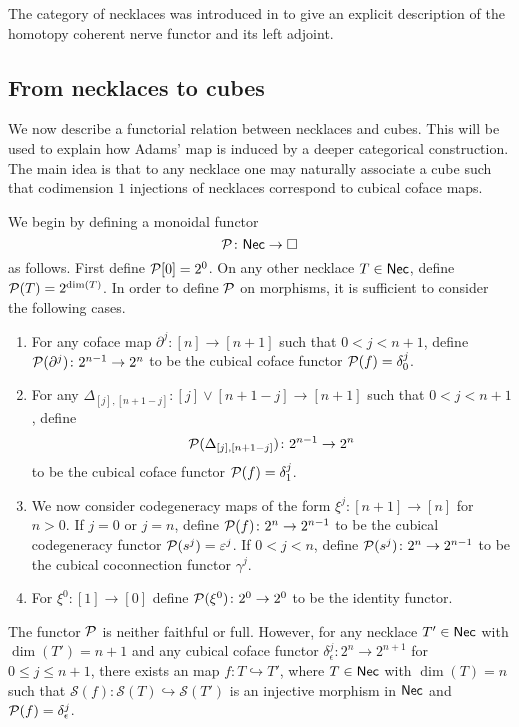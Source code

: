 \begin{remark*}
	The category of necklaces was introduced in \cite{dugger2011rigidification} to give an explicit description of the homotopy coherent nerve functor and its left adjoint.
\end{remark*}



\subsection{From necklaces to cubes}

We now describe a functorial relation between necklaces and cubes.
This will be used to explain how Adams' map is induced by a deeper categorical construction.
The main idea is that to any necklace one may naturally associate a cube such that codimension $1$ injections of necklaces correspond to cubical coface maps.

We begin by defining a monoidal functor
\[
\mathcal{P} \colon \mathsf{Nec} \to \square
\]
as follows.
First define $\mathcal{P}[0] = 2^0$.
On any other necklace $T \in \mathsf{Nec}$, define $\mathcal{P}(T) = 2^{\dim(T)}$.
In order to define $\mathcal{P}$ on morphisms, it is sufficient to consider the following cases.
\begin{enumerate}
	\item For any coface map $\partial^j \colon [n] \to [n+1]$ such that $0< j<{n+1}$, define $\mathcal{P}(\partial^j) \colon 2^{n-1}\to 2^{n}$ to be the cubical coface functor $\mathcal{P}(f)= \delta_0^{j}$.

	\item For any $\Delta_{[j], [n+1-j]} \colon [j] \vee [n+1-j] \to [n+1]$ such that $0<j<n+1$, define
	\[
	\mathcal{P}(\Delta_{[j], [n+1-j]}) \colon 2^{n-1}\to 2^{n}
	\]
	to be the cubical coface functor $\mathcal{P}(f)=\delta_1^{j}$.

	\item We now consider codegeneracy maps of the form $\xi^j \colon [n+1] \to [n]$ for $n>0$.
	If $j=0$ or $j=n$, define $\mathcal{P}(f) \colon 2^n \to 2^{n-1}$ to be the cubical codegeneracy functor $\mathcal{P}(s^j)= \varepsilon^{j}$.
	If $0<j<n$, define $\mathcal{P}(s^j) \colon 2^n \to 2^{n-1}$ to be the cubical coconnection functor $\gamma^{j}$.

	\item For $\xi^0 \colon [1] \to [0]$ define $\mathcal{P}(\xi^0) \colon 2^0 \to 2^0$ to be the identity functor.
\end{enumerate}

\begin{remark*}
	The functor $\mathcal{P}$ is neither faithful or full.
	However, for any necklace $T' \in \mathsf{Nec}$ with $\dim(T')=n+1$ and any cubical coface functor $\delta_{\epsilon}^j \colon 2^n \to 2^{n+1}$ for $0 \leq j \leq n+1$, there exists an map $f \colon T \hookrightarrow T'$, where $T \in \mathsf{Nec}$ with $\dim(T)=n$ such that $\mathcal{S}(f) \colon \mathcal{S}(T) \hookrightarrow \mathcal{S}(T')$ is an injective morphism in $\mathsf{Nec}$ and $\mathcal{P}(f) = \delta_{\epsilon}^j$.
\end{remark*}

